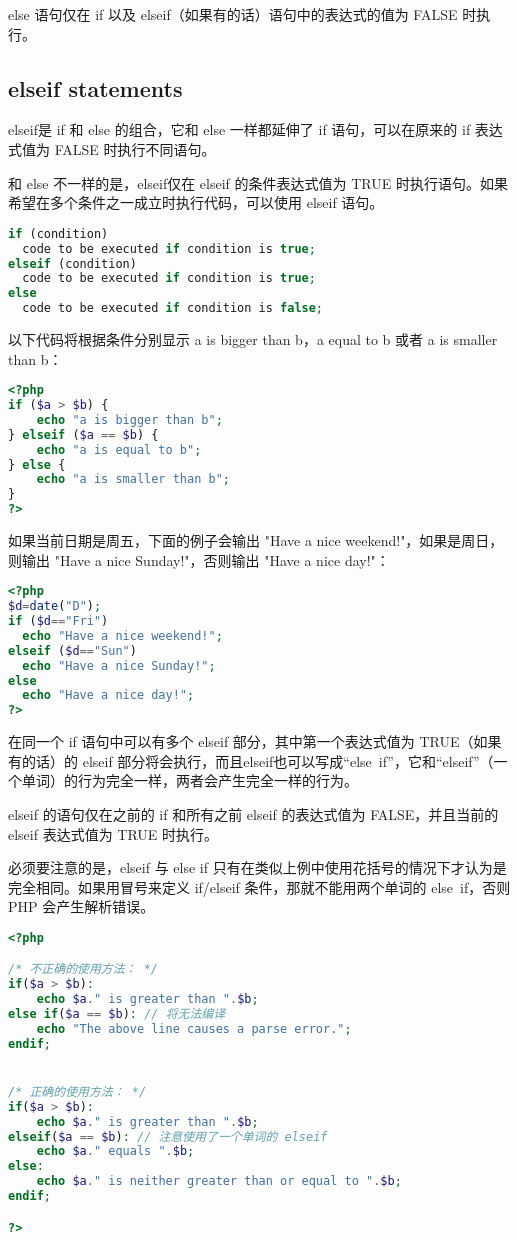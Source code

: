 else 语句仅在 if 以及 elseif（如果有的话）语句中的表达式的值为 FALSE 时执行。


\subsection{elseif statements}

elseif是 if 和 else 的组合，它和 else 一样都延伸了 if 语句，可以在原来的 if 表达式值为 FALSE 时执行不同语句。

和 else 不一样的是，elseif仅在 elseif 的条件表达式值为 TRUE 时执行语句。如果希望在多个条件之一成立时执行代码，可以使用 elseif 语句。

\begin{lstlisting}[language=PHP]
if (condition)
  code to be executed if condition is true;
elseif (condition)
  code to be executed if condition is true;
else
  code to be executed if condition is false; 
\end{lstlisting}

以下代码将根据条件分别显示 a is bigger than b，a equal to b 或者 a is smaller than b：

\begin{lstlisting}[language=PHP]
<?php
if ($a > $b) {
    echo "a is bigger than b";
} elseif ($a == $b) {
    echo "a is equal to b";
} else {
    echo "a is smaller than b";
}
?>
\end{lstlisting}

如果当前日期是周五，下面的例子会输出 "Have a nice weekend!"，如果是周日，则输出 "Have a nice Sunday!"，否则输出 "Have a nice day!"：

\begin{lstlisting}[language=PHP]
<?php
$d=date("D");
if ($d=="Fri")
  echo "Have a nice weekend!"; 
elseif ($d=="Sun")
  echo "Have a nice Sunday!"; 
else
  echo "Have a nice day!"; 
?>
\end{lstlisting}

在同一个 if 语句中可以有多个 elseif 部分，其中第一个表达式值为 TRUE（如果有的话）的 elseif 部分将会执行，而且elseif也可以写成“else~if”，它和“elseif”（一个单词）的行为完全一样，两者会产生完全一样的行为。

elseif 的语句仅在之前的 if 和所有之前 elseif 的表达式值为 FALSE，并且当前的 elseif 表达式值为 TRUE 时执行。

必须要注意的是，elseif 与 else if 只有在类似上例中使用花括号的情况下才认为是完全相同。如果用冒号来定义 if/elseif 条件，那就不能用两个单词的 else~if，否则 PHP 会产生解析错误。

\begin{lstlisting}[language=PHP]
<?php

/* 不正确的使用方法： */
if($a > $b):
    echo $a." is greater than ".$b;
else if($a == $b): // 将无法编译
    echo "The above line causes a parse error.";
endif;


/* 正确的使用方法： */
if($a > $b):
    echo $a." is greater than ".$b;
elseif($a == $b): // 注意使用了一个单词的 elseif
    echo $a." equals ".$b;
else:
    echo $a." is neither greater than or equal to ".$b;
endif;

?>
\end{lstlisting}

